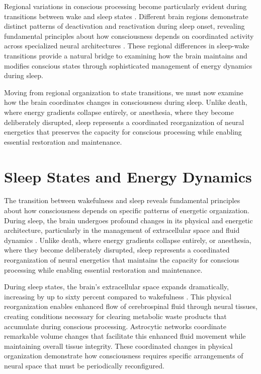 \begin{refsection}
Regional variations in conscious processing become particularly evident during transitions between wake and sleep states \cite{Dehaene2006}. Different brain regions demonstrate distinct patterns of deactivation and reactivation during sleep onset, revealing fundamental principles about how consciousness depends on coordinated activity across specialized neural architectures \cite{Fox2005}. These regional differences in sleep-wake transitions provide a natural bridge to examining how the brain maintains and modifies conscious states through sophisticated management of energy dynamics during sleep.

Moving from regional organization to state transitions, we must now examine how the brain coordinates changes in consciousness during sleep. Unlike death, where energy gradients collapse entirely, or anesthesia, where they become deliberately disrupted, sleep represents a coordinated reorganization of neural energetics that preserves the capacity for conscious processing while enabling essential restoration and maintenance.

\section{Sleep States and Energy Dynamics}

The transition between wakefulness and sleep reveals fundamental principles about how consciousness depends on specific patterns of energetic organization. During sleep, the brain undergoes profound changes in its physical and energetic architecture, particularly in the management of extracellular space and fluid dynamics \cite{Xie2013}. Unlike death, where energy gradients collapse entirely, or anesthesia, where they become deliberately disrupted, sleep represents a coordinated reorganization of neural energetics that maintains the capacity for conscious processing while enabling essential restoration and maintenance.

During sleep states, the brain's extracellular space expands dramatically, increasing by up to sixty percent compared to wakefulness \cite{Nedergaard2020}. This physical reorganization enables enhanced flow of cerebrospinal fluid through neural tissues, creating conditions necessary for clearing metabolic waste products that accumulate during conscious processing. Astrocytic networks coordinate remarkable volume changes that facilitate this enhanced fluid movement while maintaining overall tissue integrity. These coordinated changes in physical organization demonstrate how consciousness requires specific arrangements of neural space that must be periodically reconfigured.


\end{refsection}
